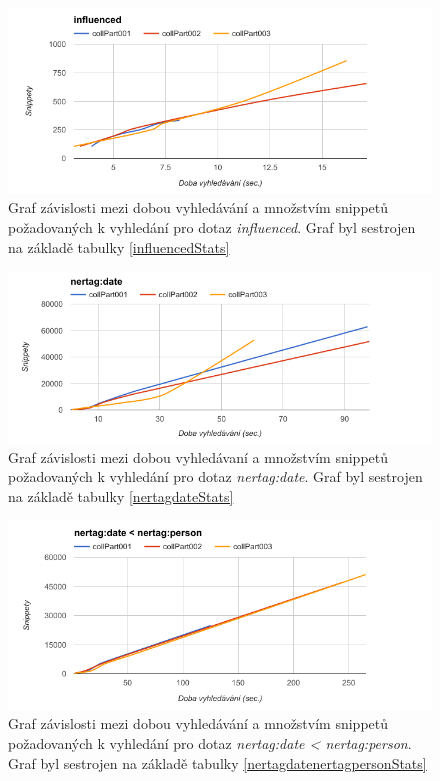 \begin{figure}[H]
\includegraphics[scale=0.7]{obrazky-figures/influenced_time_n_of_snippets.png}
\caption{Graf závislosti mezi dobou vyhledávání a množstvím snippetů požadovaných k vyhledání pro dotaz \emph{influenced}. Graf byl sestrojen na základě tabulky \ref{influencedStats}}
\label{influenced_time_n_of_snpts}
\end{figure}

\begin{figure}[H]
\includegraphics[scale=0.7]{obrazky-figures/nertag_date_time_n_of_snippets.png}
\caption{Graf závislosti mezi dobou vyhledávaní a množstvím snippetů požadovaných k vyhledání pro dotaz \emph{nertag:date}. Graf byl sestrojen na základě tabulky \ref{nertagdateStats}}
\label{nertag_date_time_n_of_snpts}
\end{figure}

\begin{figure}[H]
\includegraphics[scale=0.7]{obrazky-figures/nertag_date_nertag_person_time_n_of_snippets.png}
\caption{Graf závislosti mezi dobou vyhledávání a množstvím snippetů požadovaných k vyhledání pro dotaz \emph{nertag:date < nertag:person}. Graf byl sestrojen na základě tabulky \ref{nertagdatenertagpersonStats}}
\label{nertag_date_nertag_person_time_n_of_snpts}
\end{figure}

